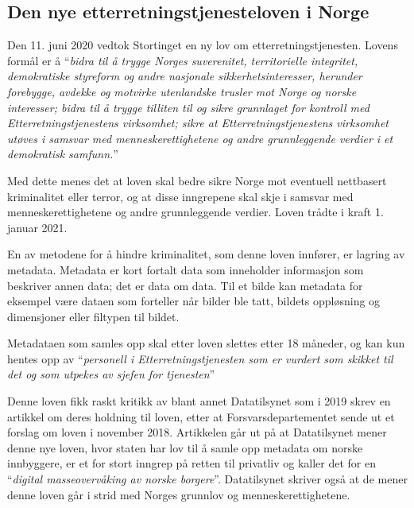 \subsection{Den nye etterretningstjenesteloven i Norge}
Den 11. juni 2020 vedtok Stortinget en ny lov om etterretningstjenesten. \parencite{artikkel:regjeringen_nylov}
Lovens formål er å ``\textit{bidra til å trygge Norges suverenitet, territorielle integritet, demokratiske styreform og andre nasjonale sikkerhetsinteresser, herunder forebygge, avdekke og motvirke utenlandske trusler mot Norge og norske interesser; bidra til å trygge tilliten til og sikre grunnlaget for kontroll med Etterretningstjenestens virksomhet; sikre at Etterretningstjenestens virksomhet utøves i samsvar med menneskerettighetene og andre grunnleggende verdier i et demokratisk samfunn.}'' \parencite[§1-1]{artikkel:lovdata_etterretningstjenesten} 
\newpage

Med dette menes det at loven skal bedre sikre Norge mot eventuell nettbasert kriminalitet eller terror, og at disse inngrepene skal skje i samsvar med menneskerettighetene og andre grunnleggende verdier. Loven trådte i kraft 1. januar 2021.

En av metodene for å hindre kriminalitet, som denne loven innfører, er lagring av metadata. \parencite[§7-7]{artikkel:lovdata_etterretningstjenesten} Metadata er kort fortalt data som inneholder informasjon som beskriver annen data; det er data om data. Til et bilde kan metadata for eksempel være dataen som forteller når bilder ble tatt, bildets oppløsning og dimensjoner eller filtypen til bildet. 

Metadataen som samles opp skal etter loven slettes etter 18 måneder, og kan kun hentes opp av ``\textit{personell i Etterretningstjenesten som er vurdert som skikket til det og som utpekes av sjefen for tjenesten}'' \parencite[§7-8]{artikkel:lovdata_etterretningstjenesten}

Denne loven fikk raskt kritikk av blant annet Datatilsynet som i 2019 skrev en artikkel om deres holdning til loven, etter at Forsvarsdepartementet sende ut et forslag om loven i november 2018. Artikkelen går ut på at Datatilsynet mener denne nye loven, hvor staten har lov til å samle opp metadata om norske innbyggere, er et for stort inngrep på retten til privatliv og kaller det for en ``\textit{digital masseovervåking av norske borgere}''. Datatilsynet skriver også at de mener denne loven går i strid med Norges grunnlov og menneskerettighetene. \parencite{artikkel:datatilsynet_etterretningstjenesten}

